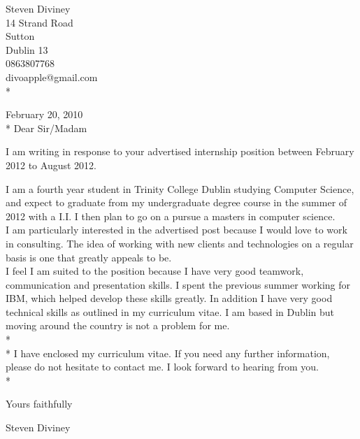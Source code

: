 \documentclass[a4paper,12pt]{article}
\begin{document}
\begin{flushright}
   Steven Diviney \\
   14 Strand Road \\
   Sutton \\
   Dublin 13 \\
   0863807768 \\
   divoapple@gmail.com \\* \vspace{10 mm}
\end{flushright}
\begin{flushleft}
 
February 20, 2010\\*\vspace{10 mm}
Dear Sir/Madam
\end{flushleft}
I am writing in response to your advertised internship position between February 2012 to August 2012.

I am a fourth year student in Trinity College Dublin studying Computer Science, and expect to graduate from my undergraduate degree course in the summer of 2012 with a I.I. I then plan to go on a pursue a masters in computer science.\\
I am particularly interested in the advertised post because I would love to work in consulting. The idea of working with new clients and technologies on a regular basis is one that greatly appeals to be.\\
I feel I am suited to the position because I have very good teamwork, communication and presentation skills. I spent the previous summer working for IBM, which helped develop these skills greatly. In addition I have very good technical skills as outlined in my curriculum vitae. I am based in Dublin but moving around the country is not a problem for me.
\\*
\\*
I have enclosed my curriculum vitae. If you need any further information, please do not hesitate to contact me. I look forward to hearing from you.\\*

\begin{flushleft}
Yours faithfully\\\vspace{10mm}

Steven Diviney\\
\end{flushleft}
\end{document}
